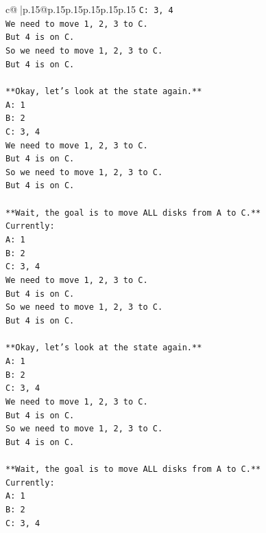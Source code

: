 \documentclass{article}
\begin{document}
{\begin{supertabular}{c@{$\;$}|p{.15\linewidth}@{}p{.15\linewidth}p{.15\linewidth}p{.15\linewidth}p{.15\linewidth}p{.15\linewidth}}
{{{\texttt{C: 3, 4} \\
\texttt{We need to move 1, 2, 3 to C.} \\
\texttt{But 4 is on C.} \\
\texttt{So we need to move 1, 2, 3 to C.} \\
\texttt{But 4 is on C.} \\
\\ 
\texttt{**Okay, let's look at the state again.**} \\
\texttt{A: 1} \\
\texttt{B: 2} \\
\texttt{C: 3, 4} \\
\texttt{We need to move 1, 2, 3 to C.} \\
\texttt{But 4 is on C.} \\
\texttt{So we need to move 1, 2, 3 to C.} \\
\texttt{But 4 is on C.} \\
\\ 
\texttt{**Wait, the goal is to move ALL disks from A to C.**} \\
\texttt{Currently:} \\
\texttt{A: 1} \\
\texttt{B: 2} \\
\texttt{C: 3, 4} \\
\texttt{We need to move 1, 2, 3 to C.} \\
\texttt{But 4 is on C.} \\
\texttt{So we need to move 1, 2, 3 to C.} \\
\texttt{But 4 is on C.} \\
\\ 
\texttt{**Okay, let's look at the state again.**} \\
\texttt{A: 1} \\
\texttt{B: 2} \\
\texttt{C: 3, 4} \\
\texttt{We need to move 1, 2, 3 to C.} \\
\texttt{But 4 is on C.} \\
\texttt{So we need to move 1, 2, 3 to C.} \\
\texttt{But 4 is on C.} \\
\\ 
\texttt{**Wait, the goal is to move ALL disks from A to C.**} \\
\texttt{Currently:} \\
\texttt{A: 1} \\
\texttt{B: 2} \\
\texttt{C: 3, 4} \\
}}}
\end{supertabular}}
\end{document}
